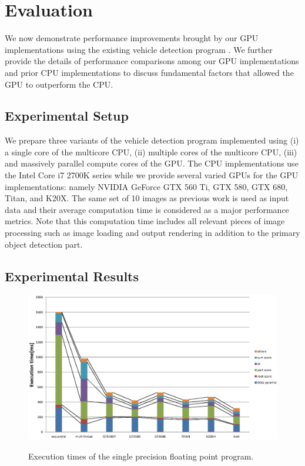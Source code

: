 \section{Evaluation}
\label{sec:evaluation}

We now demonstrate performance improvements brought by our GPU
implementations using the existing vehicle detection program
\cite{Niknejad12}.
We further provide the details of performance comparisons among our GPU
implementations and prior CPU implementations to discuss fundamental
factors that allowed the GPU to outperform the CPU.

\subsection{Experimental Setup}
\label{sec:setup}

We prepare three variants of the vehicle detection program implemented
using (i) a single core of the multicore CPU, (ii) multiple cores of the
multicore CPU, (iii) and massively parallel compute cores of the GPU.
The CPU implementations use the Intel Core i7 2700K series while we
provide several varied GPUs for the GPU implementations: namely NVIDIA
GeForce GTX 560 Ti, GTX 580, GTX 680, Titan, and K20X.
The same set of 10 images as previous work \cite{Niknejad12} is used as
input data and their average computation time is considered as a major
performance metrics.
Note that this computation time includes all relevant pieces of image
processing such as image loading and output rendering in addition to the
primary object detection part.

\subsection{Experimental Results}
\label{sec:results}

\begin{figure}[t]
 \begin{center}
  \includegraphics[width=\hsize]{fig/float_exe_time.eps}\\
  \caption{Execution times of the single precision floating point program.}
  \label{fig:float_exe_time}
 \end{center}
\end{figure}

